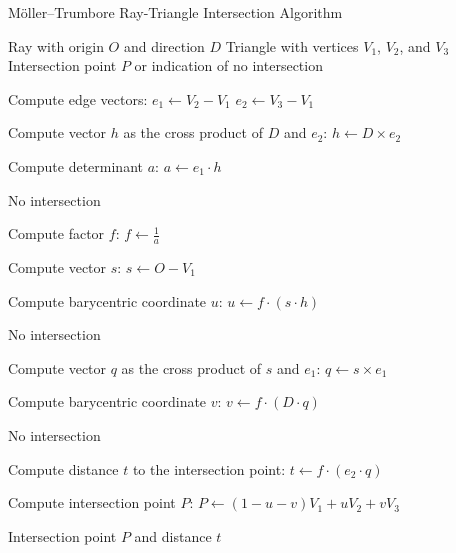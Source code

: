 \documentclass[11pt, a4paper,oneside,chapterprefix=false]{scrbook}
\begin{document}
\begin{algorithm}[H]
\caption{Möller–Trumbore Ray-Triangle Intersection Algorithm}\label{alg:ray_triangle_intersection}
\begin{algorithmic}
\Require Ray with origin \( O \) and direction \( D \)
\Require Triangle with vertices \( V_1 \), \( V_2 \), and \( V_3 \)
\Ensure Intersection point \( P \) or indication of no intersection

\State Compute edge vectors:
\State \hspace{0.5cm} \( e_1 \gets V_2 - V_1 \)
\State \hspace{0.5cm} \( e_2 \gets V_3 - V_1 \)

\State Compute vector \( h \) as the cross product of \( D \) and \( e_2 \):
\State \hspace{0.5cm} \( h \gets D \times e_2 \)

\State Compute determinant \( a \):
\State \hspace{0.5cm} \( a \gets e_1 \cdot h \)

    \State \Return No intersection  
\EndIf

\State Compute factor \( f \):
\State \hspace{0.5cm} \( f \gets \frac{1}{a} \)

\State Compute vector \( s \):
\State \hspace{0.5cm} \( s \gets O - V_1 \)

\State Compute barycentric coordinate \( u \):
\State \hspace{0.5cm} \( u \gets f \cdot (s \cdot h) \)

    \State \Return No intersection
\EndIf

\State Compute vector \( q \) as the cross product of \( s \) and \( e_1 \):
\State \hspace{0.5cm} \( q \gets s \times e_1 \)

\State Compute barycentric coordinate \( v \):
\State \hspace{0.5cm} \( v \gets f \cdot (D \cdot q) \)

    \State \Return No intersection
\EndIf

\State Compute distance \( t \) to the intersection point:
\State \hspace{0.5cm} \( t \gets f \cdot (e_2 \cdot q) \)

\State Compute intersection point \( P \):
\State \hspace{0.5cm} \( P \gets (1 - u - v) V_1 + u V_2 + v V_3 \)

\State \Return Intersection point \( P \) and distance \( t \)
\end{algorithmic}
\end{algorithm}
\end{document}

